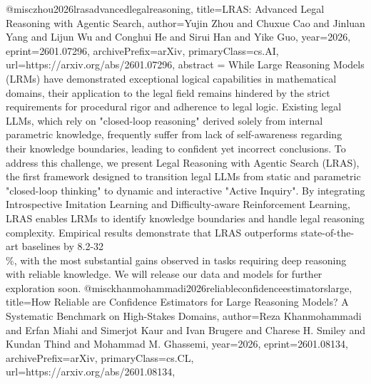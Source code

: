 {}@misc{zhou2026lrasadvancedlegalreasoning,
      title={LRAS: Advanced Legal Reasoning with Agentic Search}, 
      author={Yujin Zhou and Chuxue Cao and Jinluan Yang and Lijun Wu and Conghui He and Sirui Han and Yike Guo},
      year={2026},
      eprint={2601.07296},
      archivePrefix={arXiv},
      primaryClass={cs.AI},
      url={https://arxiv.org/abs/2601.07296},
      abstract = {While Large Reasoning Models (LRMs) have demonstrated exceptional logical capabilities in mathematical domains, their application to the legal field remains hindered by the strict requirements for procedural rigor and adherence to legal logic. Existing legal LLMs, which rely on "closed-loop reasoning" derived solely from internal parametric knowledge, frequently suffer from lack of self-awareness regarding their knowledge boundaries, leading to confident yet incorrect conclusions. To address this challenge, we present Legal Reasoning with Agentic Search (LRAS), the first framework designed to transition legal LLMs from static and parametric "closed-loop thinking" to dynamic and interactive "Active Inquiry". By integrating Introspective Imitation Learning and Difficulty-aware Reinforcement Learning, LRAS enables LRMs to identify knowledge boundaries and handle legal reasoning complexity. Empirical results demonstrate that LRAS outperforms state-of-the-art baselines by 8.2-32\\\%, with the most substantial gains observed in tasks requiring deep reasoning with reliable knowledge. We will release our data and models for further exploration soon.}
}@misc{khanmohammadi2026reliableconfidenceestimatorslarge,
      title={How Reliable are Confidence Estimators for Large Reasoning Models? A Systematic Benchmark on High-Stakes Domains}, 
      author={Reza Khanmohammadi and Erfan Miahi and Simerjot Kaur and Ivan Brugere and Charese H. Smiley and Kundan Thind and Mohammad M. Ghassemi},
      year={2026},
      eprint={2601.08134},
      archivePrefix={arXiv},
      primaryClass={cs.CL},
      url={https://arxiv.org/abs/2601.08134},
}
